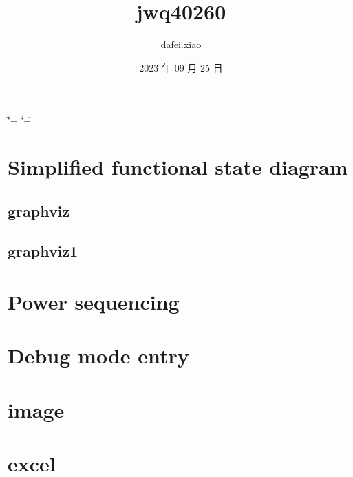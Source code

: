 \documentclass[letterpaper,10pt,english]{sphinxmanual}
\title{jwq40260}
\date{2023 年 09 月 25 日}
\author{dafei.xiao}
\begin{document}
\ifdefined\shorthandoff
  \ifnum\catcode`\=\string=\active\shorthandoff{=}\fi
  \ifnum\catcode`\"=\active{}\fi
\fi

\pagestyle{empty}
\sphinxmaketitle
\pagestyle{plain}
\sphinxtableofcontents
\pagestyle{normal}
\label{\detokenize{index::doc}}


\sphinxstepscope


\chapter{Simplified functional state diagram}
\label{\detokenize{FS8530/fsm:simplified-functional-state-diagram}}\label{\detokenize{FS8530/fsm::doc}}

\section{graphviz}
\label{\detokenize{FS8530/fsm:graphviz}}


\section{graphviz1}
\label{\detokenize{FS8530/fsm:graphviz1}}


\chapter{Power sequencing}
\label{\detokenize{FS8530/fsm:power-sequencing}}


\chapter{Debug mode entry}
\label{\detokenize{FS8530/fsm:debug-mode-entry}}
\noindent{}


\chapter{image}
\label{\detokenize{FS8530/fsm:image}}
\noindent{}


\chapter{excel}
\label{\detokenize{FS8530/fsm:excel}}
\end{document}
